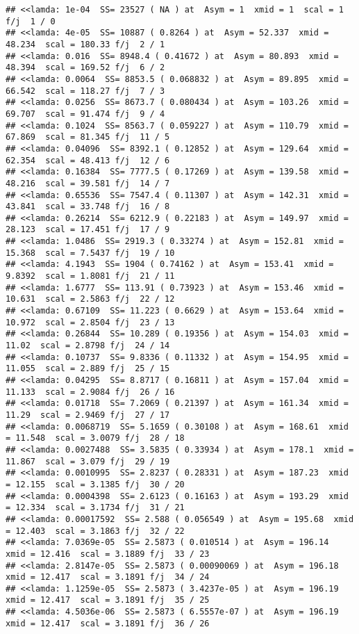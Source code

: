 \documentclass[
]{article}
\begin{document}
\begin{verbatim}
## <<lamda: 1e-04  SS= 23527 ( NA ) at  Asym = 1  xmid = 1  scal = 1 f/j  1 / 0
## <<lamda: 4e-05  SS= 10887 ( 0.8264 ) at  Asym = 52.337  xmid = 48.234  scal = 180.33 f/j  2 / 1
## <<lamda: 0.016  SS= 8948.4 ( 0.41672 ) at  Asym = 80.893  xmid = 48.394  scal = 169.52 f/j  6 / 2
## <<lamda: 0.0064  SS= 8853.5 ( 0.068832 ) at  Asym = 89.895  xmid = 66.542  scal = 118.27 f/j  7 / 3
## <<lamda: 0.0256  SS= 8673.7 ( 0.080434 ) at  Asym = 103.26  xmid = 69.707  scal = 91.474 f/j  9 / 4
## <<lamda: 0.1024  SS= 8563.7 ( 0.059227 ) at  Asym = 110.79  xmid = 67.869  scal = 81.345 f/j  11 / 5
## <<lamda: 0.04096  SS= 8392.1 ( 0.12852 ) at  Asym = 129.64  xmid = 62.354  scal = 48.413 f/j  12 / 6
## <<lamda: 0.16384  SS= 7777.5 ( 0.17269 ) at  Asym = 139.58  xmid = 48.216  scal = 39.581 f/j  14 / 7
## <<lamda: 0.65536  SS= 7547.4 ( 0.11307 ) at  Asym = 142.31  xmid = 43.841  scal = 33.748 f/j  16 / 8
## <<lamda: 0.26214  SS= 6212.9 ( 0.22183 ) at  Asym = 149.97  xmid = 28.123  scal = 17.451 f/j  17 / 9
## <<lamda: 1.0486  SS= 2919.3 ( 0.33274 ) at  Asym = 152.81  xmid = 15.368  scal = 7.5437 f/j  19 / 10
## <<lamda: 4.1943  SS= 1904 ( 0.74162 ) at  Asym = 153.41  xmid = 9.8392  scal = 1.8081 f/j  21 / 11
## <<lamda: 1.6777  SS= 113.91 ( 0.73923 ) at  Asym = 153.46  xmid = 10.631  scal = 2.5863 f/j  22 / 12
## <<lamda: 0.67109  SS= 11.223 ( 0.6629 ) at  Asym = 153.64  xmid = 10.972  scal = 2.8504 f/j  23 / 13
## <<lamda: 0.26844  SS= 10.289 ( 0.19356 ) at  Asym = 154.03  xmid = 11.02  scal = 2.8798 f/j  24 / 14
## <<lamda: 0.10737  SS= 9.8336 ( 0.11332 ) at  Asym = 154.95  xmid = 11.055  scal = 2.889 f/j  25 / 15
## <<lamda: 0.04295  SS= 8.8717 ( 0.16811 ) at  Asym = 157.04  xmid = 11.133  scal = 2.9084 f/j  26 / 16
## <<lamda: 0.01718  SS= 7.2069 ( 0.21397 ) at  Asym = 161.34  xmid = 11.29  scal = 2.9469 f/j  27 / 17
## <<lamda: 0.0068719  SS= 5.1659 ( 0.30108 ) at  Asym = 168.61  xmid = 11.548  scal = 3.0079 f/j  28 / 18
## <<lamda: 0.0027488  SS= 3.5835 ( 0.33934 ) at  Asym = 178.1  xmid = 11.867  scal = 3.079 f/j  29 / 19
## <<lamda: 0.0010995  SS= 2.8237 ( 0.28331 ) at  Asym = 187.23  xmid = 12.155  scal = 3.1385 f/j  30 / 20
## <<lamda: 0.0004398  SS= 2.6123 ( 0.16163 ) at  Asym = 193.29  xmid = 12.334  scal = 3.1734 f/j  31 / 21
## <<lamda: 0.00017592  SS= 2.588 ( 0.056549 ) at  Asym = 195.68  xmid = 12.403  scal = 3.1863 f/j  32 / 22
## <<lamda: 7.0369e-05  SS= 2.5873 ( 0.010514 ) at  Asym = 196.14  xmid = 12.416  scal = 3.1889 f/j  33 / 23
## <<lamda: 2.8147e-05  SS= 2.5873 ( 0.00090069 ) at  Asym = 196.18  xmid = 12.417  scal = 3.1891 f/j  34 / 24
## <<lamda: 1.1259e-05  SS= 2.5873 ( 3.4237e-05 ) at  Asym = 196.19  xmid = 12.417  scal = 3.1891 f/j  35 / 25
## <<lamda: 4.5036e-06  SS= 2.5873 ( 6.5557e-07 ) at  Asym = 196.19  xmid = 12.417  scal = 3.1891 f/j  36 / 26
\end{verbatim}
\end{document}
